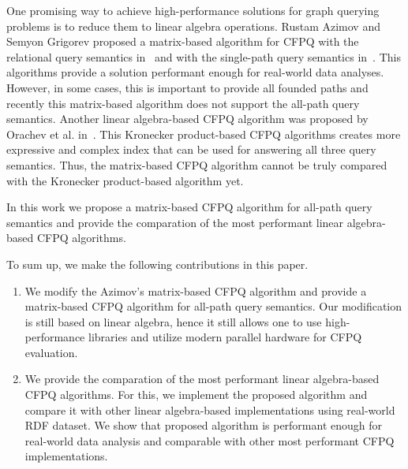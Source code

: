 One promising way to achieve high-performance solutions for graph querying problems is to reduce them to linear algebra operations. Rustam Azimov and Semyon Grigorev proposed a matrix-based algorithm for CFPQ with the relational query semantics in~\cite{Azimov:2018:CPQ:3210259.3210264} and with the single-path query semantics in~\cite{10.1145/3398682.3399163}.
This algorithms provide a solution performant enough for real-world data analyses.
However, in some cases, this is important to provide all founded paths and recently this matrix-based algorithm does not support the all-path query semantics. Another linear algebra-based CFPQ algorithm was proposed by Orachev et al. in~\cite{kron}. This Kronecker product-based CFPQ algorithms creates more expressive and complex index that can be used for answering all three query semantics. Thus, the matrix-based CFPQ algorithm cannot be truly compared with the Kronecker product-based algorithm yet.

In this work we propose a matrix-based CFPQ algorithm for all-path query semantics and provide the comparation of the most performant linear algebra-based CFPQ algorithms.

To sum up, we make the following contributions in this paper.
\begin{enumerate}
	\item We modify the Azimov's matrix-based CFPQ algorithm and provide a matrix-based CFPQ algorithm for all-path query semantics.
	Our modification is still based on linear algebra, hence it still allows one to use high-performance libraries and utilize modern parallel hardware for CFPQ evaluation.
	\item We provide the comparation of the most performant linear algebra-based CFPQ algorithms. For this, we implement the proposed algorithm and compare it with other linear algebra-based implementations using real-world RDF dataset. We show that proposed algorithm is performant enough for real-world data analysis and comparable with other most performant CFPQ implementations.
\end{enumerate}